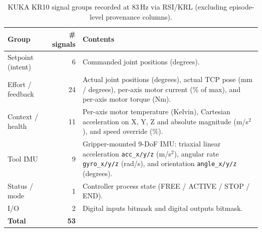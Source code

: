 \documentclass{article}
\begin{document}
\begin{table}[htbp]
    \centering
    \caption{KUKA KR10 signal groups recorded at 83\,Hz via RSI/KRL (excluding episode-level provenance columns).}
    \label{tab:kuka_signals}
    \small
    \begin{tabular}{@{}lrp{7.5cm}@{}}
        \toprule
        Group             & \# signals  & Contents                                                                                                                                                                           \\
        \midrule
        Setpoint (intent) & 6           & Commanded joint positions (degrees).                                                                                                                                               \\
        Effort / feedback & 24          & Actual joint positions (degrees), actual TCP pose (mm / degrees), per-axis motor current (\% of max), and per-axis motor torque (Nm).                                              \\
        Context / health  & 11          & Per-axis motor temperature (Kelvin), Cartesian acceleration on X, Y, Z and absolute magnitude (m/s$^2$), and speed override (\%).                                                  \\
        Tool IMU          & 9           & Gripper-mounted 9-DoF IMU: triaxial linear acceleration \texttt{acc\_x/y/z} (m/s$^2$), angular rate \texttt{gyro\_x/y/z} (rad/s), and orientation \texttt{angle\_x/y/z} (degrees). \\
        Status / mode     & 1           & Controller process state (FREE / ACTIVE / STOP / END).                                                                                                                             \\
        I/O               & 2           & Digital inputs bitmask and digital outputs bitmask.                                                                                                                                \\
        \midrule
        \textbf{Total}    & \textbf{53} &                                                                                                                                                                                    \\
        \bottomrule
    \end{tabular}
\end{table}
\end{document}
